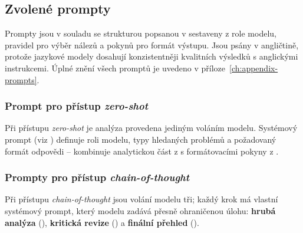 \newpage
\subsection{Zvolené prompty}
\label{subsec:choice-prompts}

Prompty jsou v souladu se strukturou popsanou v  sestaveny z role modelu, pravidel pro výběr nálezů a pokynů pro formát výstupu.
Jsou psány v angličtině, protože jazykové modely dosahují konzistentněji kvalitních výsledků s anglickými instrukcemi.
Úplné znění všech promptů je uvedeno v příloze~\ref{ch:appendix-prompts}.

\subsubsection*{Prompt pro přístup \textit{zero-shot}}
\label{subsubsec:choice-prompts-zeroshot}

Při přístupu \textit{zero-shot} je analýza provedena jediným voláním modelu.
Systémový prompt (viz ) definuje roli modelu, typy hledaných problémů a požadovaný formát odpovědi -- kombinuje analytickou část z  s formátovacími pokyny z .

\subsubsection*{Prompty pro přístup \textit{chain-of-thought}}
\label{subsubsec:choice-prompts-cot}

Při přístupu \textit{chain-of-thought} jsou volání modelu tři; každý krok má vlastní systémový prompt, který modelu zadává přesně ohraničenou úlohu: \textbf{hrubá analýza} (), \textbf{kritická revize} () a \textbf{finální přehled} ().

\endinput